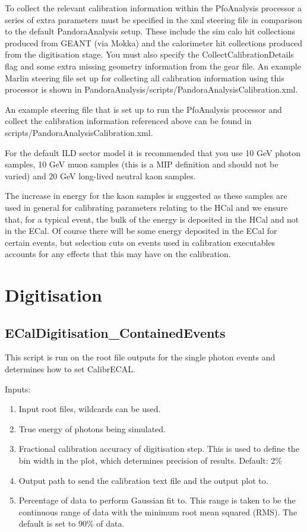\documentclass[11pt, oneside]{article}   	%
\begin{document}
To collect the relevant calibration information within the PfoAnalysis processor a series of extra parameters must be specified in the xml steering file in comparison to the default PandoraAnalysis setup.  These include the sim calo hit collections produced from GEANT (via Mokka) and the calorimeter hit collections produced from the digitisation stage.  You must also specify the CollectCalibrationDetails flag and some extra missing geometry information from the gear file.  An example Marlin steering file set up for collecting all calibration information using this processor is shown in PandoraAnalysis/scripts/PandoraAnalysisCalibration.xml.

An example steering file that is set up to run the PfoAnalysis processor and collect the calibration information referenced above can be found in scripts/PandoraAnalysisCalibration.xml. 

For the default ILD sector model it is recommended that you use 10 GeV photon samples, 10 GeV muon samples (this is a MIP definition and should not be varied) and 20 GeV long-lived neutral kaon samples.  

The increase in energy for the kaon samples is suggested as these samples are used in general for calibrating parameters relating to the HCal and we ensure that, for a typical event, the bulk of the energy is deposited in the HCal and not in the ECal.  Of course there will be some energy deposited in the ECal for certain events, but selection cuts on events used in calibration executables accounts for any effects that this may have on the calibration.  

\section{Digitisation}

\subsection{ECalDigitisation\_ContainedEvents}

This script is run on the root file outputs for the single photon events and determines how to set CalibrECAL.

Inputs:
\begin{enumerate}
\item Input root files, wildcards can be used.
\item True energy of photons being simulated.
\item Fractional calibration accuracy of digitisation step.  This is used to define the bin width in the plot, which determines precision of results.  Default: 2\%
\item Output path to send the calibration text file and the output plot to.
\item Percentage of data to perform Gaussian fit to.  This range is taken to be the continuous range of data with the minimum root mean squared (RMS).  The default is set to 90\% of data.
\end{enumerate}
\end{document}
